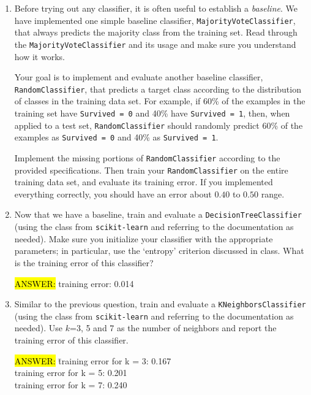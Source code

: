 \begin{enumerate}[resume]

\item {} Before trying out any classifier, it is often useful to establish a \emph{baseline}. We have implemented one simple baseline classifier, \verb|MajorityVoteClassifier|, that always predicts the majority class from the training set. Read through the \verb|MajorityVoteClassifier| and its usage and make sure you understand how it works.

Your goal is to implement and evaluate another baseline classifier, \verb|RandomClassifier|, that predicts a target class according to the distribution of classes in the training data set. For example, if 60\% of the examples in the training set have \verb|Survived = 0| and 40\% have \verb|Survived = 1|, then, when applied to a test set, \verb|RandomClassifier| should randomly predict 60\% of the examples as \verb|Survived = 0| and 40\% as \verb|Survived = 1|.

Implement the missing portions of \verb|RandomClassifier| according to the provided specifications. Then train your \verb|RandomClassifier| on the entire training data set, and evaluate its training error. If you implemented everything correctly, you should have an error about $0.40$ to $0.50$ range.

\item {} Now that we have a baseline, train and evaluate a \verb|DecisionTreeClassifier| (using the class from \verb|scikit-learn| and referring to the documentation as needed). Make sure you initialize your classifier with the appropriate parameters; in particular, use the `entropy' criterion discussed in class. What is the training error of this classifier?

\hl{ANSWER:} training error: 0.014

\item {} Similar to the previous question, train and evaluate a \verb|KNeighborsClassifier| (using the class from \verb|scikit-learn| and referring to the documentation as needed). Use $k$=3, 5 and 7 as the number of neighbors and report the training error of this classifier.

\begin{tabbing}
\hl{ANSWER:} \= training error for k = 3: 0.167 \\

\> training error for k = 5: 0.201 \\

\> training error for k = 7: 0.240
\end{tabbing}


\end{enumerate}

